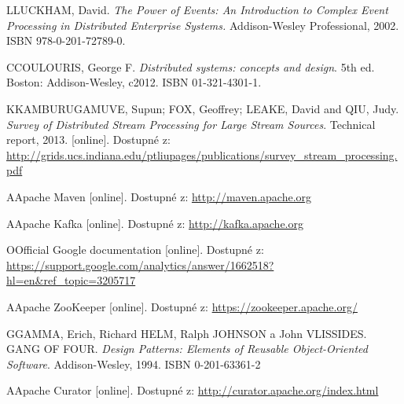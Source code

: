 \documentclass[
  digital, %
  table,   %
  nolof,     %
  nolot,     %
  twoside, %
  nocover,
  monochrome,
  12pt
]{fithesis3}
\begin{document}
\begin{thebibliography}{99}
\bibitem
LLUCKHAM, David. \textit{The Power of Events: An Introduction to Complex
Event Processing in Distributed Enterprise Systems.} Addison-Wesley Professional, 2002. ISBN 978-0-201-72789-0. \label{bib_1}

\bibitem
CCOULOURIS, George F. \textit{Distributed systems: concepts and design}. 5th ed. Boston: Addison-Wesley, c2012. ISBN 01-321-4301-1. \label{bib_2}

\bibitem
KKAMBURUGAMUVE, Supun; FOX, Geoffrey; LEAKE, David and QIU, Judy. \textit{Survey of Distributed Stream Processing for Large Stream Sources}. Technical report, 2013. [online]. Dostupné z: \url{http://grids.ucs.indiana.edu/ptliupages/publications/survey_stream_processing.pdf} \label{bib_3}

\bibitem
AApache Maven [online]. Dostupné z: \url{http://maven.apache.org} \label{bib_4}

\bibitem
AApache Kafka [online]. Dostupné z: \url{http://kafka.apache.org} \label{bib_5}

\bibitem
OOfficial Google documentation  [online]. Dostupné z: \url{https://support.google.com/analytics/answer/1662518?hl=en&ref_topic=3205717} \label{bib_6}

\bibitem
AApache ZooKeeper [online]. Dostupné z: \url{https://zookeeper.apache.org/} \label{bib_7}

\bibitem
GGAMMA, Erich, Richard HELM, Ralph JOHNSON a John VLISSIDES. GANG OF FOUR. \textit{Design Patterns: Elements of Reusable Object-Oriented Software}. Addison-Wesley, 1994. ISBN 0-201-63361-2 \label{bib_8}

\bibitem
AApache Curator [online]. Dostupné z: \url{http://curator.apache.org/index.html} \label{bib_9}

\end{thebibliography}
\appendix %
\end{document}
